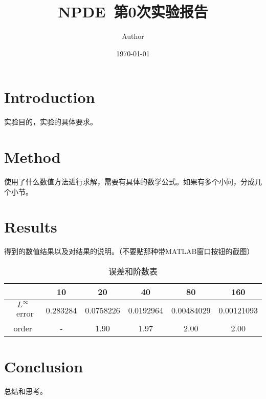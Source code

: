 \documentclass{article}
\title{NPDE~第0次实验报告}
\author{Author}
\date{\today}
\begin{document}
\maketitle

\section{Introduction}

实验目的，实验的具体要求。

\section{Method}

使用了什么数值方法进行求解，需要有具体的数学公式。如果有多个小问，分成几个小节。


\section{Results}

得到的数值结果以及对结果的说明。（不要贴那种带MATLAB窗口按钮的截图）


\begin{table}[ht]
    \centering
    \caption{误差和阶数表}\label{tab:demo0}
    \begin{tabular}{c|ccccc}
        \hline
                           & 10       & 20        & 40        & 80         & 160        \\
        \hline
        $L^{\infty}$~error & 0.283284 & 0.0758226 & 0.0192964 & 0.00484029 & 0.00121093 \\
        order              & -        & 1.90      & 1.97      & 2.00       & 2.00       \\
        \hline
    \end{tabular}
\end{table}


\section{Conclusion}

总结和思考。
\end{document}
